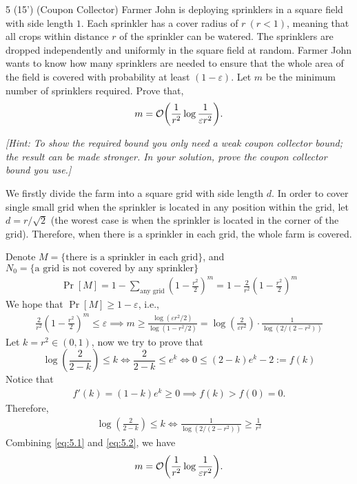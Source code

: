\begin{question}{5 (15') (Coupon Collector)}
Farmer John is deploying sprinklers in a square field with side length $1$. Each sprinkler has a cover radius of $r\ (r < 1)$, meaning that all crops within distance $r$ of the sprinkler can be watered. The sprinklers are dropped independently and uniformly in the square field at random. Farmer John wants to know how many sprinklers are needed to ensure that the whole area of the field is covered with probability at least $(1 - \varepsilon)$. Let $m$ be the minimum number of sprinklers required. Prove that,
\[ m = \order{\frac{1}{r^2} \log{\frac{1}{\varepsilon r^2}}}. \]

\textit{[Hint: To show the required bound you only need a weak coupon collector bound; the result can be made stronger. In your solution, prove the coupon collector bound you use.]}
\end{question}

\begin{answer}
    We firstly divide the farm into a square grid with side length $d$. In order to cover single small grid when the sprinkler is located in any position within the grid, let $d = r/\sqrt{2}$ (the worest case is when the sprinkler is located in the corner of the grid).  
    Therefore, when there is a sprinkler in each grid, the whole farm is covered.

    Denote $M = \{\text{there is a sprinkler in each grid}\}$, and $N_0 = \{\text{a grid is not covered by any sprinkler}\}$
    \begin{align*}
        \Pr[M] = 1 -  \sum_{\text{any grid}} \left(1 - \frac{r^2}{2}\right)^m = 1 - \frac{2}{r^2} \left(1 - \frac{r^2}{2}\right)^m 
    \end{align*}
    We hope that $\Pr[M] \ge 1 - \varepsilon$, i.e.,
    \begin{align}
        \label{eq:5.1}
        \frac{2}{r^2} \left(1 - \frac{r^2}{2}\right)^m \le \varepsilon \implies m \ge \frac{\log(\varepsilon r^2/2)}{\log\left(1 - r^2/2\right)} = \log (\frac{2}{\varepsilon r^2}) \cdot \frac{1}{\log (2/(2-r^2))}
    \end{align}
    Let $k = r^2 \in (0,1)$, now we try to prove that 
    \[
        \log\left(\frac{2}{2-k}\right) \le k \iff \frac{2}{2-k} \le e^k \iff 0 \le (2-k)e^k - 2 := f(k)
    \]
    Notice that 
    \begin{align*}
        f'(k) = (1-k)e^k \ge 0 \implies f(k) > f(0) = 0. 
    \end{align*}
    Therefore, 
    \begin{align}
        \label{eq:5.2}
        \log\left(\frac{2}{2-k}\right) \le k \iff \frac{1}{\log (2/(2-r^2))}  \ge \frac{1}{r^2}
    \end{align}
    Combining \eqref{eq:5.1} and \eqref{eq:5.2}, we have
    \begin{align*}
        m = \order{\frac{1}{r^2} \log\frac{1}{\varepsilon r^2}}.
    \end{align*}
    \ed
\end{answer}